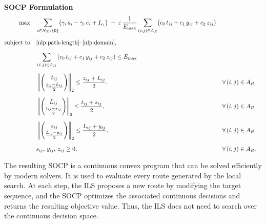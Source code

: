 \documentclass[11pt]{article}
\begin{document}
\vspace{4mm}
\noindent\textbf{SOCP Formulation}
\begin{align}
\max \quad
& \sum_{i \in N_R \setminus \{0\}} \bigl(\gamma_i\, a_i - \gamma_i\, e_i + I_{e_i} \bigr)
\;-\; \varepsilon\, \frac{1}{E_{\max}}
\sum_{(i,j) \in A_R}
\bigl( c_0\, t_{ij} + c_1\, y_{ij} + c_2\, z_{ij} \bigr)
\label{socp:obj} \\[6pt]
\text{subject to} \quad
& \eqref{nlp:path-length}\text{--}\eqref{nlp:domain}, \notag \\[6pt]
& \sum_{(i,j) \in A_R}
\left( c_0\, t_{ij} + c_1\, y_{ij} + c_2\, z_{ij} \right)
\le E_{\max} \label{socp:energy} \\[6pt]
& \left\lVert
\begin{pmatrix}
t_{ij} \\[2pt]
\frac{z_{ij}-L_{ij}}{2}
\end{pmatrix}
\right\rVert_2
\le \frac{z_{ij}+L_{ij}}{2},
&& \forall\, (i,j) \in A_R \label{socp:cone-z} \\[6pt]
& \left\lVert
\begin{pmatrix}
L_{ij} \\[2pt]
\frac{t_{ij}-s_{ij}}{2}
\end{pmatrix}
\right\rVert_2
\le \frac{t_{ij}+s_{ij}}{2},
&& \forall\, (i,j) \in A_R \label{socp:cone-s} \\[6pt]
& \left\lVert
\begin{pmatrix}
s_{ij} \\[2pt]
\frac{L_{ij}-y_{ij}}{2}
\end{pmatrix}
\right\rVert_2
\le \frac{L_{ij}+y_{ij}}{2},
&& \forall\, (i,j) \in A_R \label{socp:cone-y} \\[6pt]
& s_{ij},\, y_{ij},\, z_{ij} \ge 0,
&& \forall\, (i,j) \in A_R. \notag
\end{align}

The resulting SOCP is a continuous convex program that can be solved efficiently by modern solvers. It is used to evaluate every route generated by the local search. At each step, the ILS proposes a new route by modifying the target sequence, and the SOCP optimizes the associated continuous decisions and returns the resulting objective value. Thus, the ILS does not need to search over the continuous decision space.
\end{document}
